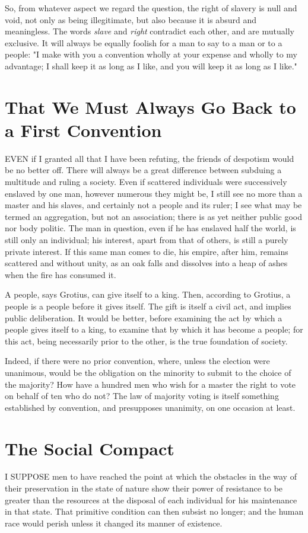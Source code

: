 \documentclass[12pt]{book}
\begin{document}
So, from whatever aspect we regard the question, the right of slavery is null and void, not only as being illegitimate, but also because it is absurd and meaningless. The words \textit{slave} and \textit{right} contradict each other, and are mutually exclusive. It will always be equally foolish for a man to say to a man or to a people: "I make with you a convention wholly at your expense and wholly to my advantage; I shall keep it as long as I like, and you will keep it as long as I like."

\section{That We Must Always Go Back to a First Convention}
EVEN if I granted all that I have been refuting, the friends of despotism would be no better off. There will always be a great difference between subduing a multitude and ruling a society. Even if scattered individuals were successively enslaved by one man, however numerous they might be, I still see no more than a master and his slaves, and certainly not a people and its ruler; I see what may be termed an aggregation, but not an association; there is as yet neither public good nor body politic. The man in question, even if he has enslaved half the world, is still only an individual; his interest, apart from that of others, is still a purely private interest. If this same man comes to die, his empire, after him, remains scattered and without unity, as an oak falls and dissolves into a heap of ashes when the fire has consumed it.

A people, says Grotius, can give itself to a king. Then, according to Grotius, a people is a people before it gives itself. The gift is itself a civil act, and implies public deliberation. It would be better, before examining the act by which a people gives itself to a king, to examine that by which it has become a people; for this act, being necessarily prior to the other, is the true foundation of society.

Indeed, if there were no prior convention, where, unless the election were unanimous, would be the obligation on the minority to submit to the choice of the majority? How have a hundred men who wish for a master the right to vote on behalf of ten who do not? The law of majority voting is itself something established by convention, and presupposes unanimity, on one occasion at least.

\section{The Social Compact}
I SUPPOSE men to have reached the point at which the obstacles in the way of their preservation in the state of nature show their power of resistance to be greater than the resources at the disposal of each individual for his maintenance in that state. That primitive condition can then subsist no longer; and the human race would perish unless it changed its manner of existence.
\end{document}
